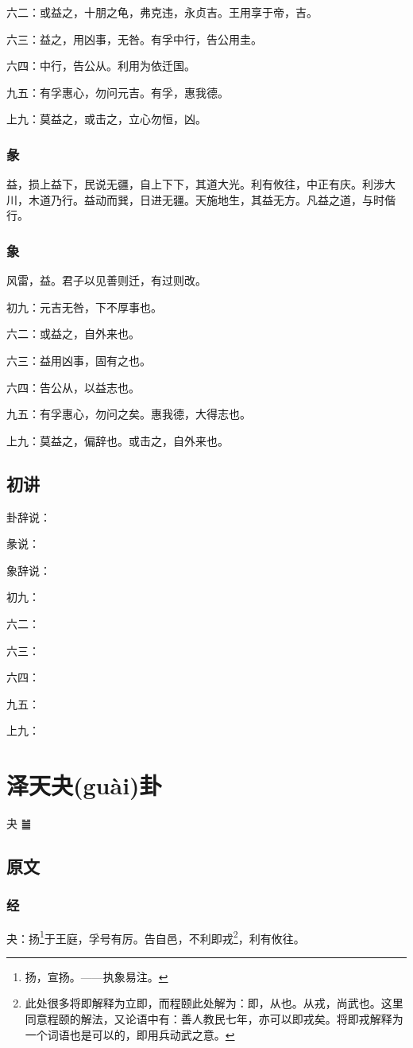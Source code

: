 \documentclass[12pt,oneside]{book}
\begin{document}
六二：或益之，十朋之龟，弗克违，永贞吉。王用享于帝，吉。

六三：益之，用凶事，无咎。有孚中行，告公用圭。

六四：中行，告公从。利用为依迁国。

九五：有孚惠心，勿问元吉。有孚，惠我德。

上九：莫益之，或击之，立心勿恒，凶。

\subsection{彖}
益，损上益下，民说无疆，自上下下，其道大光。利有攸往，中正有庆。利涉大川，木道乃行。益动而巽，日进无疆。天施地生，其益无方。凡益之道，与时偕行。

\subsection{象}
风雷，益。君子以见善则迁，有过则改。

初九：元吉无咎，下不厚事也。

六二：或益之，自外来也。

六三：益用凶事，固有之也。

六四：告公从，以益志也。

九五：有孚惠心，勿问之矣。惠我德，大得志也。

上九：莫益之，偏辞也。或击之，自外来也。

\section{初讲}
卦辞说：

彖说：

象辞说：

初九：

六二：

六三：

六四：

九五：

上九：


\chapter{泽天夬(guài)卦}
夬 {\Large ䷪}
\section{原文}

\subsection{经}
夬：扬\footnote{扬，宣扬。——执象易注。}于王庭，孚号有厉。告自邑，不利即戎\footnote{此处很多将即解释为立即，而程颐此处解为：即，从也。从戎，尚武也。这里同意程颐的解法，又论语中有：善人教民七年，亦可以即戎矣。将即戎解释为一个词语也是可以的，即用兵动武之意。}，利有攸往。
\end{document}
